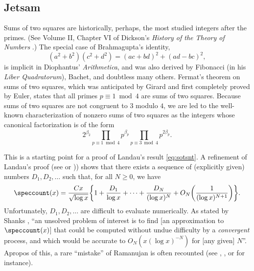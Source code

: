 \documentclass[12pt, reqno, twoside, letterpaper]{amsart}
\begin{document}
\begin{jetsam}

\section{Jetsam}
 \label{sec:jetsam}
 
 
Sums of two squares are historically, perhaps, the most studied 
integers after the primes.
%
(See Volume II, Chapter VI of Dickson's {\em History of the Theory 
of Numbers} \cite{DIC:19}.)
%
The special case of Brahmagupta's identity, 
\[
 (a^2 + b^2)(c^2 + d^2) 
  =
   (ac + bd)^2 + (ad - bc)^2,
\]
is implicit in Diophantus' {\em Arithmetica}, and was also derived 
by Fibonacci (in his {\em Liber Quadratorum}), Bachet, and 
doubtless many others.
%
Fermat's theorem on sums of two squares, which was anticipated by 
Girard and first completely proved by Euler, states that all 
primes $p \equiv 1 \bmod 4$ are sums of two squares.
%
Because sums of two squares are not congruent to $3$ modulo $4$, 
we are led to the well-known characterization of nonzero sums of 
two squares as the integers whose canonical factorization is of 
the form  
\begin{equation}
 \label{eq:canfac}
   2^{\beta_2}
    \prod_{p \equiv 1 \bmod 4}p^{\beta_p}
     \prod_{p \equiv 3 \bmod 4}p^{2\beta_p}.
\end{equation}

This is a starting point for a proof of Landau's result 
\eqref{eq:sotsnt}.
%
A refinement of Landau's proof (see \cite[(4.6.4)]{HAR:40} or 
\cite[II.5, Theorem 3]{TEN:95})) shows that there exists a 
sequence of (explicitly given) numbers $D_1,D_2,\ldots$ such that, 
for all $N \ge 0$, we have
\begin{equation}
 \label{eq:sotsntii}
 \speccount(x)
  =
   \frac{Cx}{\sqrt{\log x}}
    \bigg\{
     1 + \frac{D_1}{\log x} + \cdots + \frac{D_N}{(\log x)^N} + 
       O_N\bigg(\frac{1}{(\log x)^{N + 1}}\bigg) 
    \bigg\}. 
\end{equation}
%
Unfortunately, $D_1,D_2,\ldots$ are difficult to evaluate 
numerically. 
%
As stated by Shanks \cite{SHA:64}, ``an unsolved problem of 
interest is to find [an approximation to $\speccount(x)$] that could 
be computed without undue difficulty by a {\em convergent} 
process, and which would be accurate to $O_N(x(\log x)^{-N})$ for 
[any given] $N$''.
%
Apropos of this, a rare ``mistake'' of Ramanujan is often 
recounted (see \cite[Chapter IV]{HAR:40}, \cite{STA:28, SHA:64}, 
or \cite[pp.\ xxiv--xxviii]{RAM:00} for instance). 


\end{jetsam}
\end{document}
